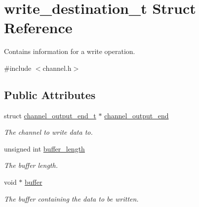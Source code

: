 \hypertarget{structwrite__destination__t}{\section{write\-\_\-destination\-\_\-t Struct Reference}
\label{structwrite__destination__t}
}


Contains information for a write operation.  




{\ttfamily \#include $<$channel.\-h$>$}

\subsection*{Public Attributes}
\begin{DoxyCompactItemize}
\item 
\hypertarget{structwrite__destination__t_afeeccbd1bab21564a18c056f29baadce}{struct \hyperlink{structchannel__output__end__t}{channel\-\_\-output\-\_\-end\-\_\-t} $\ast$ \hyperlink{structwrite__destination__t_afeeccbd1bab21564a18c056f29baadce}{channel\-\_\-output\-\_\-end}}\label{structwrite__destination__t_afeeccbd1bab21564a18c056f29baadce}

\begin{DoxyCompactList}\small\item\em The channel to write data to. \end{DoxyCompactList}\item 
\hypertarget{structwrite__destination__t_a57ae31ee92f714768c4a2839caaec744}{unsigned int \hyperlink{structwrite__destination__t_a57ae31ee92f714768c4a2839caaec744}{buffer\-\_\-length}}\label{structwrite__destination__t_a57ae31ee92f714768c4a2839caaec744}

\begin{DoxyCompactList}\small\item\em The buffer length. \end{DoxyCompactList}\item 
\hypertarget{structwrite__destination__t_aa19612b5fbdd196ccd8aa555eda023a8}{void $\ast$ \hyperlink{structwrite__destination__t_aa19612b5fbdd196ccd8aa555eda023a8}{buffer}}\label{structwrite__destination__t_aa19612b5fbdd196ccd8aa555eda023a8}

\begin{DoxyCompactList}\small\item\em The buffer containing the data to be written. \end{DoxyCompactList}\end{DoxyCompactItemize}


